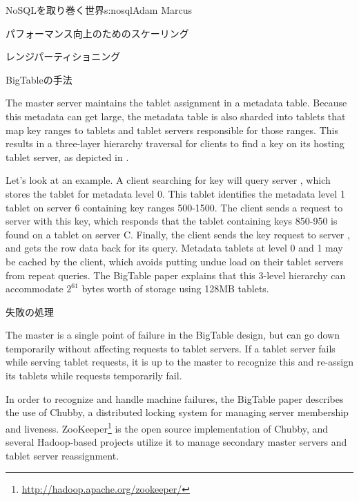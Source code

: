 \begin{aosachapter}{NoSQLを取り巻く世界}{s:nosql}{Adam Marcus}
\begin{aosasect1}{パフォーマンス向上のためのスケーリング}
\begin{aosasect2}{レンジパーティショニング}
\begin{aosasect3}{BigTableの手法}

The master server maintains the tablet assignment in a metadata table.
Because this metadata can get large, the metadata table is also
sharded into tablets that map key ranges to tablets and tablet servers
responsible for those ranges.  This results in a three-layer hierarchy
traversal for clients to find a key on its hosting tablet server,
as depicted in .

Let's look at an example.  A client searching for key
 will query server , which stores the tablet for
metadata level 0.  This tablet identifies the metadata level 1 tablet
on server 6 containing key ranges 500-1500.  The client sends a
request to server  with this key, which responds that the
tablet containing keys 850-950 is found on a tablet on server
C\@.  Finally, the client sends the key request to server , and
gets the row data back for its query.  Metadata tablets at level 0 and
1 may be cached by the client, which avoids putting undue load on
their tablet servers from repeat queries.  The BigTable paper explains
that this 3-level hierarchy can accommodate $2^{61}$ bytes worth of storage
using 128MB tablets.

\end{aosasect3}

\vspace{-0.1cm} %
\begin{aosasect3}{失敗の処理}

The master is a single point of failure in the BigTable design, but
can go down temporarily without affecting requests to tablet servers.
If a tablet server fails while serving tablet requests, it is up to
the master to recognize this and re-assign its tablets while requests
temporarily fail.

In order to recognize and handle machine failures, the BigTable paper
describes the use of Chubby, a distributed locking system for managing
server membership and liveness.
ZooKeeper\footnote{\url{http://hadoop.apache.org/zookeeper/}} is the
open source implementation of Chubby, and several Hadoop-based
projects utilize it to manage secondary master servers and tablet
server reassignment.


\end{aosasect3}
\end{aosasect2}
\end{aosasect1}
\end{aosachapter}
